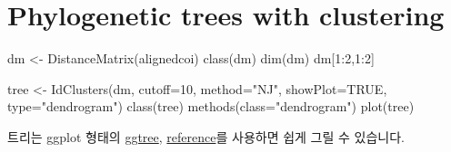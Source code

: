 \documentclass[
]{book}
\newenvironment{Shaded}{\begin{snugshade}}{\end{snugshade}}
\newcommand{\AttributeTok}[1]{\textcolor[rgb]{0.77,0.63,0.00}{#1}}
\newcommand{\ConstantTok}[1]{\textcolor[rgb]{0.00,0.00,0.00}{#1}}
\newcommand{\DecValTok}[1]{\textcolor[rgb]{0.00,0.00,0.81}{#1}}
\newcommand{\FunctionTok}[1]{\textcolor[rgb]{0.00,0.00,0.00}{#1}}
\newcommand{\NormalTok}[1]{#1}
\newcommand{\OtherTok}[1]{\textcolor[rgb]{0.56,0.35,0.01}{#1}}
\newcommand{\SpecialCharTok}[1]{\textcolor[rgb]{0.00,0.00,0.00}{#1}}
\newcommand{\StringTok}[1]{\textcolor[rgb]{0.31,0.60,0.02}{#1}}
\begin{document}
\hypertarget{phylogenetic-trees-with-clustering}{%
\section{Phylogenetic trees with clustering}\label{phylogenetic-trees-with-clustering}}

\begin{Shaded}
\begin{Highlighting}[]
\NormalTok{dm }\OtherTok{\textless{}{-}} \FunctionTok{DistanceMatrix}\NormalTok{(alignedcoi)}
\FunctionTok{class}\NormalTok{(dm)}
\FunctionTok{dim}\NormalTok{(dm)}
\NormalTok{dm[}\DecValTok{1}\SpecialCharTok{:}\DecValTok{2}\NormalTok{,}\DecValTok{1}\SpecialCharTok{:}\DecValTok{2}\NormalTok{]}

\NormalTok{tree }\OtherTok{\textless{}{-}} \FunctionTok{IdClusters}\NormalTok{(dm, }\AttributeTok{cutoff=}\DecValTok{10}\NormalTok{, }\AttributeTok{method=}\StringTok{"NJ"}\NormalTok{, }\AttributeTok{showPlot=}\ConstantTok{TRUE}\NormalTok{, }\AttributeTok{type=}\StringTok{"dendrogram"}\NormalTok{)}
\FunctionTok{class}\NormalTok{(tree)}
\FunctionTok{methods}\NormalTok{(}\AttributeTok{class=}\StringTok{"dendrogram"}\NormalTok{)}
\FunctionTok{plot}\NormalTok{(tree)}
\end{Highlighting}
\end{Shaded}

트리는 ggplot 형태의 \href{https://yulab-smu.top/treedata-book/chapter12.html}{ggtree}, \href{https://www.molecularecologist.com/2017/02/08/phylogenetic-trees-in-r-using-ggtree/}{reference}를 사용하면 쉽게 그릴 수 있습니다.
\end{document}
